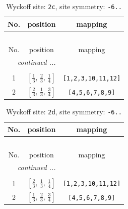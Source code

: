\documentclass[fleqn,8pt]{jsarticle}
\begin{document}
\renewcommand{\arraystretch}{1.2}
\begin{longtable}{ccc}
\caption{Wyckoff site: {\tt 2c}, site symmetry: {\tt -6..}}
 \\
 \hline \hline
No. & position & mapping \\ \hline \endfirsthead

\multicolumn{2}{l}{\tablename\ \thetable{}} \\
 \hline \hline
No. & position & mapping \\ \hline \endhead

 \hline \hline
\multicolumn{2}{r}{\footnotesize\it continued ...} \\ \endfoot

 \hline \hline
\multicolumn{2}{r}{} \\ \endlastfoot

1 & $\left[ \frac{1}{3},\, \frac{2}{3},\, \frac{1}{4} \right]$ & {\tt [1,2,3,10,11,12]} \\ \hline
2 & $\left[ \frac{2}{3},\, \frac{1}{3},\, \frac{3}{4} \right]$ & {\tt [4,5,6,7,8,9]} \\
\end{longtable}
\renewcommand{\arraystretch}{1.2}
\begin{longtable}{ccc}
\caption{Wyckoff site: {\tt 2d}, site symmetry: {\tt -6..}}
 \\
 \hline \hline
No. & position & mapping \\ \hline \endfirsthead

\multicolumn{2}{l}{\tablename\ \thetable{}} \\
 \hline \hline
No. & position & mapping \\ \hline \endhead

 \hline \hline
\multicolumn{2}{r}{\footnotesize\it continued ...} \\ \endfoot

 \hline \hline
\multicolumn{2}{r}{} \\ \endlastfoot

1 & $\left[ \frac{2}{3},\, \frac{1}{3},\, \frac{1}{4} \right]$ & {\tt [1,2,3,10,11,12]} \\ \hline
2 & $\left[ \frac{1}{3},\, \frac{2}{3},\, \frac{3}{4} \right]$ & {\tt [4,5,6,7,8,9]} \\
\end{longtable}
\renewcommand{\arraystretch}{1.2}
\end{document}
